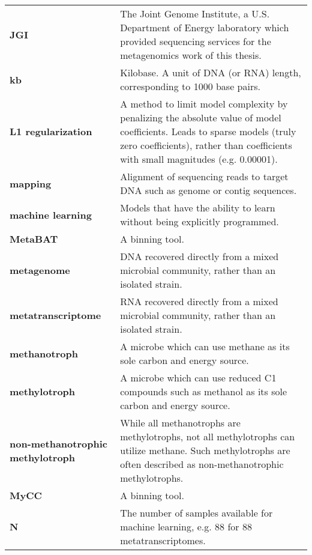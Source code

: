 \begin{singlespace}
\begin{longtable}{ p{}  p{} }
\textbf{JGI} & The Joint Genome Institute, a U.S. Department of Energy laboratory which provided sequencing
                services for the metagenomics work of this thesis. \\
\textbf{kb} & Kilobase. A unit of DNA (or RNA) length, corresponding to 1000 base pairs. \\
\textbf{L1 regularization} & A method to limit model complexity by penalizing the absolute value of model coefficients.
     Leads to sparse models (truly zero coefficients), rather than coefficients with small magnitudes (e.g. 0.00001). \\
\textbf{mapping} & Alignment of sequencing reads to target DNA such as genome or contig sequences.\\
\textbf{machine learning} & Models that have the ability to learn without being explicitly programmed. \\
\textbf{MetaBAT} &  A binning tool. \\
\textbf{metagenome} & DNA recovered directly from a mixed microbial community, rather than an isolated strain. \\
\textbf{metatranscriptome} & RNA recovered directly from a mixed microbial community, rather than an isolated strain. \\
\textbf{methanotroph} & A microbe which can use methane as its sole carbon and energy source. \\
\textbf{methylotroph} & A microbe which can use reduced C1 compounds such as methanol as its sole carbon and energy source. \\
\textbf{non-methanotrophic methylotroph} & While all methanotrophs are methylotrophs, not all methylotrophs can utilize methane.
	Such methylotrophs are often described as non-methanotrophic methylotrophs. \\
\textbf{MyCC} & A binning tool. \\
\textbf{N} & The number of samples available for machine learning, e.g. 88 for 88 metatranscriptomes. \\

\end{longtable}
\end{singlespace}
